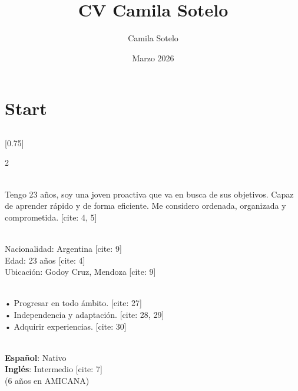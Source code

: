 \documentclass[lighthipster]{simplehipstercv}
\title{CV Camila Sotelo}
\author{Camila Sotelo}
\date{Marzo 2026}
\begin{document}
\thispagestyle{empty}

\section*{Start}


\subsection*{}
\vspace{4em}

\setlength{\columnsep}{1.5cm}
[0.75]
\begin{paracol}{2}

\paracolbackgroundoptions

\footnotesize
{\setasidefontcolour
\flushright
\begin{center}
\end{center}

\\[0.5em]
{\footnotesize
Tengo 23 años, soy una joven proactiva que va en busca de sus objetivos. Capaz de aprender rápido y de forma eficiente. Me considero ordenada, organizada y comprometida.} [cite: 4, 5]
\bigskip

 \\[0.5em]
Nacionalidad: Argentina [cite: 9] \\
Edad: 23 años [cite: 4] \\
Ubicación: Godoy Cruz, Mendoza [cite: 9]

\bigskip

 \\[0.5em]
• Progresar en todo ámbito. [cite: 27] \\
• Independencia y adaptación. [cite: 28, 29] \\
• Adquirir experiencias. [cite: 30]

\bigskip

\\[0.5em]
\textbf{Español}: Nativo \\
\textbf{Inglés}: Intermedio [cite: 7] \\
(6 años en AMICANA)

\vspace{4em}

}
\end{paracol}
\end{document}
